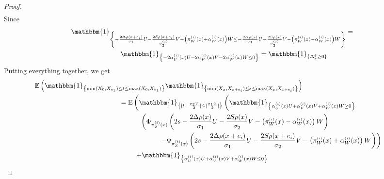 \documentclass[12pt]{article}
\theoremstyle{Theorem}
\begin{document}
\begin{proof}
{\begin{align*}
\end{align*}}
Since
{\small
\begin{align*}
\mathbbm{1}_{\left\{- \frac{2\Delta \rho(x+e_i)}{\sigma_1}U - \frac{2S \rho(x+e_i)}{\sigma^{\scriptscriptstyle(i)}_{2}}V - \left( \pi^{\scriptscriptstyle(i)}_{W}(x) +  \alpha^{\scriptscriptstyle(i)}_{W}(x)\right)W \leq  - \frac{2\Delta \rho(x)}{\sigma_1} U - \frac{2S \rho(x)}{\sigma^{\scriptscriptstyle(i)}_{2}}V - \left( \pi^{\scriptscriptstyle(i)}_{W}(x) -  \alpha^{\scriptscriptstyle(i)}_{W}(x)\right) W \right\}} & = \\
& \hspace{-11.7cm} \mathbbm{1}_{\left\{- 2\alpha^{\scriptscriptstyle(i)}_{U}(x)U - 2\alpha^{\scriptscriptstyle(i)}_{V}(x)V - 2\alpha^{\scriptscriptstyle(i)}_{W}(x)W \leq  0\right\}}  = \mathbbm{1}_{\left\{\Delta^{i}_{\scriptscriptstyle x} \geq 0\right\}}
\end{align*}}Putting everything together, we get
{\small
\begin{align}
\label{Thistho}
\mathbb{E}\left(\mathbbm{1}_{\left\{\min(X_{\scriptscriptstyle 0}, X_{e_1}) \leq t \leq \max(X_{\scriptscriptstyle 0}, X_{e_1})\right\}}\mathbbm{1}_{\left\{\min(X_{\scriptscriptstyle x}, X_{x+e_i}) \leq s \leq \max(X_{\scriptscriptstyle x}, X_{x+e_i}) \right\}}\right) \nonumber \\
& \hspace{-9.5cm} = \mathbb{E}\left(\mathbbm{1}_{\left\{ |t - \frac{\sigma_2V}{2}| \leq |\frac{\sigma_1U}{2}|\right\}} \left( \mathbbm{1}_{\left\{ \alpha^{\scriptscriptstyle(i)}_{U}(x)U +  \alpha^{\scriptscriptstyle(i)}_{V}(x) V +  \alpha^{\scriptscriptstyle(i)}_{W}(x) W \geq 0\right\}} \right. \right. \nonumber \\
& \hspace{-8.5cm}\left. \left. \left(\Phi_{ \pi^{\scriptscriptstyle(i)}_{Z}(x)}\left( 2s - \frac{2\Delta \rho(x) }{\sigma_1} U - \frac{2S\rho(x)}{\sigma_{2}}V - \left( \pi^{\scriptscriptstyle(i)}_{W}(x) -  \alpha^{\scriptscriptstyle(i)}_{W}(x)\right) W \right)  \right. \right. \right. \nonumber \\
& \hspace{-7.5cm}\left. \left. \left. - \Phi_{ \pi^{\scriptscriptstyle(i)}_{Z}(x)}\left( 2s - \frac{2\Delta \rho(x+e_i) }{\sigma_1}U - \frac{2S \rho(x+e_i) }{\sigma_{2}}V - \left( \pi^{\scriptscriptstyle(i)}_{W}(x) +  \alpha^{\scriptscriptstyle(i)}_{W}(x) \right)W \right)  \right) \right. \right. \nonumber \\
&  \hspace{-8.75cm} \left. \left. + \mathbbm{1}_{\left\{ \alpha^{\scriptscriptstyle(i)}_{U}(x)U +  \alpha^{\scriptscriptstyle(i)}_{V}(x) V +  \alpha^{\scriptscriptstyle(i)}_{W}(x) W \leq 0\right\}} \right. \right. \nonumber\\

\end{align}}
\end{proof}
\end{document}
